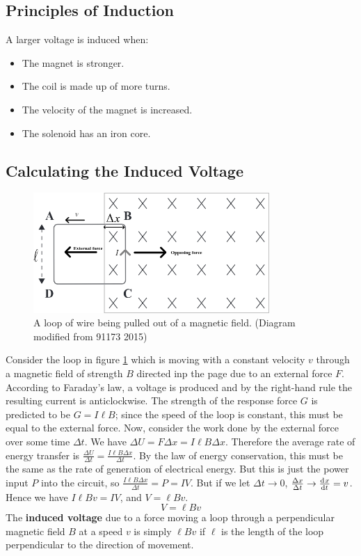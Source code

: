 \documentclass[a4paper]{amsbook}
\begin{document}
\subsection{Principles of Induction}
A larger voltage is induced when:
\begin{itemize}
  \item The magnet is stronger.
  \item The coil is made up of more turns.
  \item The velocity of the magnet is increased.
  \item The solenoid has an iron core.
\end{itemize}

\subsection{Calculating the Induced Voltage}
\begin{figure}
  \centering
  \includegraphics[width=0.8\textwidth]{induction3}
  \caption{A loop of wire being pulled out of a magnetic field. (Diagram modified from 91173 2015)\label{fig:induction3}}
\end{figure}

Consider the loop in figure \ref{fig:induction3} which is moving with a constant velocity $ v $ through a magnetic field
of strength $ B $ directed inp the page due to an external force $ F $. According to Faraday's law, a voltage is produced
and by the right-hand rule the resulting current is anticlockwise. The strength of the response force $ G $ is predicted to
be $ G = I \ell B $; since the speed of the loop is constant, this must be equal to the external force. Now, consider the
work done by the external force over some time $ \Delta t $. We have $ \Delta U = F\Delta x = I \ell B \Delta x $. Therefore
the average rate of energy transfer is $ \frac{\Delta U}{\Delta t} = \frac{I \ell B \Delta x}{\Delta t} $. By the law of
energy conservation, this must be the same as the rate of generation of electrical energy. But this is just the power input $ P $
into the circuit, so $ \frac{I \ell B \Delta x}{\Delta t} = P = IV $. But if we let $ \Delta t \to 0 $, $ \frac{\Delta x}{\Delta t} \to \od{x}{t} = v $.
Hence we have $ I \ell B v = IV $, and $ V = \ell B v $.
\begin{equation}
  V = \ell B v
\end{equation}
The \textbf{induced voltage} due to a force moving a loop through a perpendicular magnetic field $ B $ at a speed $ v $ is simply $ \ell B v $ if
$ \ell $ is the length of the loop perpendicular to the direction of movement.
\end{document}
